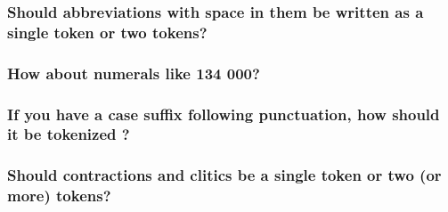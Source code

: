 \documentclass[fleqn]{article}
\begin{document}
\subsubsection{Should abbreviations with space in them be written as a single token or two tokens?}

\subsubsection{How about numerals like 134 000?}

\subsubsection{If you have a case suffix following punctuation, how should it be tokenized ?}

\subsubsection{Should contractions and clitics be a single token or two (or more) tokens?}
\end{document}
